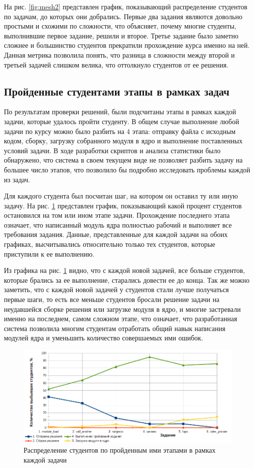 \documentclass[a4paper,12pt]{article}
\begin{document}
На рис. \ref{fig:mesh2} представлен график, показывающий распределение студентов по задачам, до которых они добрались. Первые два задания являются довольно простыми и схожими по сложности, что объясняет, почему многие студенты, выполнившие первое задание, решили и второе. Третье задание было заметно сложнее и большинство студентов прекратили прохождение курса именно на ней. Данная метрика позволила понять, что разница в сложности между второй и третьей задачей слишком велика, что оттолкнуло студентов от ее решения.

\subsection{Пройденные студентами этапы в рамках задач}
По результатам проверки решений, были подсчитаны этапы в рамках каждой задачи, которые удалось пройти студенту. В общем случае выполнение любой задачи по курсу можно было разбить на 4 этапа: отправку файла с исходным кодом, сборку, загрузку собранного модуля в ядро и выполнение поставленных условий задачи. В ходе разработки скриптов и анализа статистики было обнаружено, что система в своем текущем виде не позволяет разбить задачу на большее число этапов, что позволило бы подробно исследовать проблемы каждой из задач.

Для каждого студента был посчитан шаг, на котором он оставил ту или иную задачу. На рис. \ref{fig:mesh3} представлен график, показывающий какой процент студентов остановился на том или ином этапе задачи. Прохождение последнего этапа означает, что написанный модуль ядра полностью рабочий и выполняет все требования задания. Данные, представленные для каждой задачи на обоих графиках, высчитывались относительно только тех студентов, которые приступили к ее выполнению.

Из графика на рис. \ref{fig:mesh3} видно, что с каждой новой задачей, все больше студентов, которые брались за ее выполнение, старались довести ее до конца. Так же можно заметить, что с каждой новой задачей у студентов стали лучше получаться первые шаги, то есть все меньше студентов бросали решение задачи на неудавшейся сборке решения или загрузке модуля в ядро, и многие застревали именно на последнем, самом сложном  этапе, что означает, что разработанная система позволила многим студентам отработать общий навык написания модулей ядра и уменьшить количество совершаемых ими ошибок.

\begin{figure}[h]
	\centering
	\includegraphics[width=\textwidth]{steps.png}
	\caption{Распределение студентов по пройденным ими этапами в рамках каждой задачи}
	\label{fig:mesh3}
\end{figure}
\end{document}
